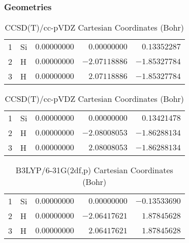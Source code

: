\documentclass[10pt,oneside]{article}
\begin{document}
\clearpage

\subsection{}

\begin{table}[h!]
\subsubsection*{Geometries}
\begin{multicols}{2}
\centering
\caption{CCSD(T)/cc-pVTZ Cartesian Coordinates (Bohr)}
\begin{tabular}{llrrr}
\toprule
1  & Si & $ 0.00000000$ & $ 0.00000000$ & $ 0.13352287$ \\
2  & H  & $ 0.00000000$ & $-2.07118886$ & $-1.85327784$ \\
3  & H  & $ 0.00000000$ & $ 2.07118886$ & $-1.85327784$ \\
\bottomrule
\end{tabular}
\caption{CCSD(T)/cc-pVDZ Cartesian Coordinates (Bohr)}
\begin{tabular}{llrrr}
\toprule
1  & Si & $ 0.00000000$ & $ 0.00000000$ & $ 0.13421478$ \\
2  & H  & $ 0.00000000$ & $-2.08008053$ & $-1.86288134$ \\
3  & H  & $ 0.00000000$ & $ 2.08008053$ & $-1.86288134$ \\
\bottomrule
\end{tabular}
\end{multicols}
\end{table}

\begin{table}[h]
\centering
\caption{B3LYP/6-31G(2df,p) Cartesian Coordinates (Bohr)}
\begin{tabular}{llrrr}
\toprule
1  & Si & $ 0.00000000$ & $ 0.00000000$ & $-0.13533690$ \\
2  & H  & $ 0.00000000$ & $-2.06417621$ & $ 1.87845628$ \\
3  & H  & $ 0.00000000$ & $ 2.06417621$ & $ 1.87845628$ \\
\bottomrule
\end{tabular}
\end{table}
\end{document}
